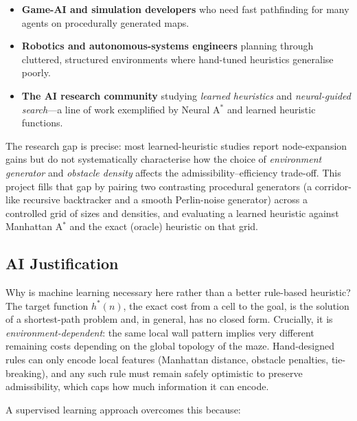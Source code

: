 \documentclass[11pt]{article}
\begin{document}
\begin{itemize}
  \item \textbf{Game-AI and simulation developers} who need fast pathfinding for many
  agents on procedurally generated maps.
  \item \textbf{Robotics and autonomous-systems engineers} planning through cluttered,
  structured environments where hand-tuned heuristics generalise poorly.
  \item \textbf{The AI research community} studying \emph{learned heuristics} and
  \emph{neural-guided search}---a line of work exemplified by Neural A$^\ast$
  \cite{yonetani2021} and learned heuristic functions.
\end{itemize}

The research gap is precise: most learned-heuristic studies report node-expansion gains
but do not systematically characterise how the choice of \emph{environment generator}
and \emph{obstacle density} affects the admissibility--efficiency trade-off. This project
fills that gap by pairing two contrasting procedural generators (a corridor-like
recursive backtracker and a smooth Perlin-noise generator) across a controlled grid of
sizes and densities, and evaluating a learned heuristic against Manhattan A$^\ast$ and
the exact (oracle) heuristic on that grid.

\subsection{AI Justification}
Why is machine learning necessary here rather than a better rule-based heuristic? The
target function $h^\ast(n)$, the exact cost from a cell to the goal, is the solution of a
shortest-path problem and, in general, has no closed form. Crucially, it is
\emph{environment-dependent}: the same local wall pattern implies very different
remaining costs depending on the global topology of the maze. Hand-designed rules can
only encode local features (Manhattan distance, obstacle penalties, tie-breaking), and
any such rule must remain safely optimistic to preserve admissibility, which caps how
much information it can encode.

A supervised learning approach overcomes this because:
\end{document}
